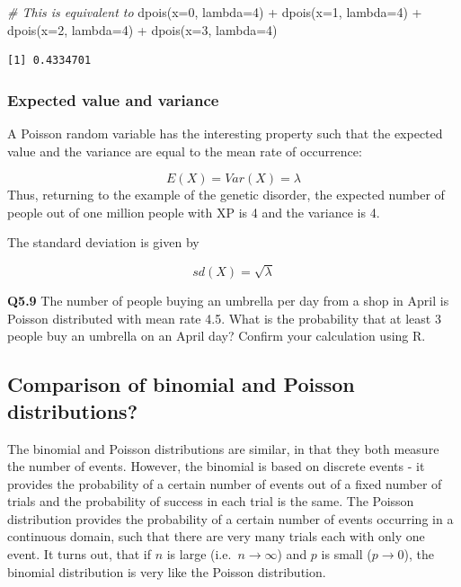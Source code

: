 \documentclass[
  oneside]{krantz}
\newenvironment{Shaded}{\begin{snugshade}}{\end{snugshade}}
\newcommand{\AttributeTok}[1]{\textcolor[rgb]{0.77,0.63,0.00}{#1}}
\newcommand{\CommentTok}[1]{\textcolor[rgb]{0.56,0.35,0.01}{\textit{#1}}}
\newcommand{\DecValTok}[1]{\textcolor[rgb]{0.00,0.00,0.81}{#1}}
\newcommand{\FunctionTok}[1]{\textcolor[rgb]{0.00,0.00,0.00}{#1}}
\newcommand{\NormalTok}[1]{#1}
\newcommand{\SpecialCharTok}[1]{\textcolor[rgb]{0.00,0.00,0.00}{#1}}
\begin{document}
\begin{Shaded}
\begin{Highlighting}[]
\CommentTok{\# This is equivalent to}
\FunctionTok{dpois}\NormalTok{(}\AttributeTok{x=}\DecValTok{0}\NormalTok{, }\AttributeTok{lambda=}\DecValTok{4}\NormalTok{) }\SpecialCharTok{+} \FunctionTok{dpois}\NormalTok{(}\AttributeTok{x=}\DecValTok{1}\NormalTok{, }\AttributeTok{lambda=}\DecValTok{4}\NormalTok{) }\SpecialCharTok{+} \FunctionTok{dpois}\NormalTok{(}\AttributeTok{x=}\DecValTok{2}\NormalTok{, }\AttributeTok{lambda=}\DecValTok{4}\NormalTok{) }\SpecialCharTok{+} \FunctionTok{dpois}\NormalTok{(}\AttributeTok{x=}\DecValTok{3}\NormalTok{, }\AttributeTok{lambda=}\DecValTok{4}\NormalTok{) }
\end{Highlighting}
\end{Shaded}

\begin{verbatim}
[1] 0.4334701
\end{verbatim}

\hypertarget{expected-value-and-variance}{%
\subsubsection{Expected value and variance}\label{expected-value-and-variance}}

A Poisson random variable has the interesting property such that the expected value and the variance are equal to the mean rate of occurrence:

\[E(X) = Var(X) = \lambda\]
Thus, returning to the example of the genetic disorder, the expected number of people out of one million people with XP is 4 and the variance is 4.

The standard deviation is given by

\[sd(X) = \sqrt{\lambda}\]

\textbf{Q5.9} The number of people buying an umbrella per day from a shop in April is Poisson
distributed with mean rate 4.5. What is the probability that at least 3 people buy an umbrella on an April day? Confirm your calculation using R.

\hypertarget{comparison-of-binomial-and-poisson-distributions}{%
\subsection{Comparison of binomial and Poisson distributions?}\label{comparison-of-binomial-and-poisson-distributions}}

The binomial and Poisson distributions are similar, in that they both measure the number of events. However, the binomial is based on discrete events - it provides the probability of a certain number of events out of a fixed number of trials and the probability of success in each trial is the same. The Poisson distribution provides the probability of a certain number of events occurring in a continuous domain, such that there are very many trials each with only one event. It turns out, that if \(n\) is large (i.e.~\(n \rightarrow \infty\)) and \(p\) is small (\(p \rightarrow 0\)), the binomial distribution is very like the Poisson distribution.
\end{document}
